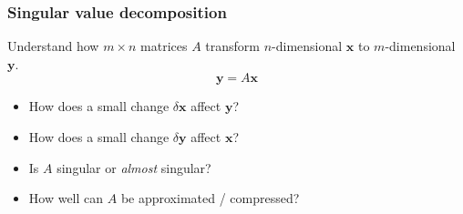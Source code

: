 \documentclass[xcolor={dvipsnames}]{beamer}
\begin{document}
\begin{frame}
\frametitle{Singular value decomposition}
Understand how $m \times n$ matrices $A$ transform $n$-dimensional $\mathbf{x}$ to $m$-dimensional $\mathbf{y}$.
\begin{equation*}
\mathbf{y} = A \mathbf{x}
\end{equation*}
\begin{itemize}
    \item How does a small change $\delta \mathbf{x}$ affect $\mathbf{y}$?
    \item How does a small change $\delta \mathbf{y}$ affect $\mathbf{x}$?
    \item Is $A$ singular or \emph{almost} singular?
    \item How well can $A$ be approximated / compressed?
\end{itemize}
\end{frame}
\end{document}
